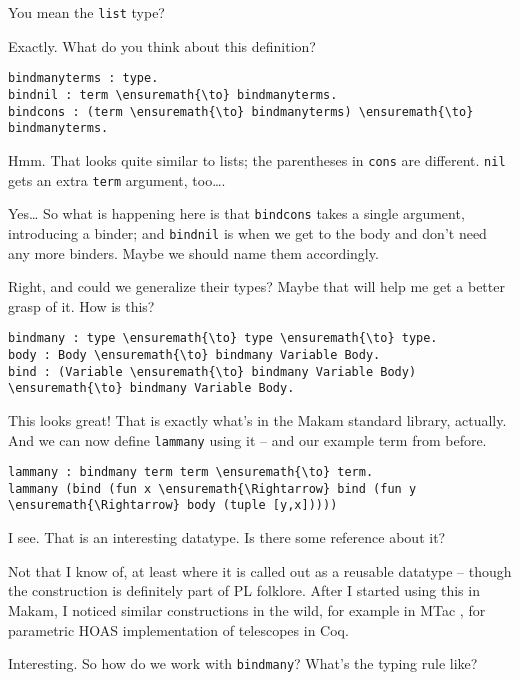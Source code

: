 \heroSTUDENT{} You mean the \texttt{list} type?

\heroADVISOR{} Exactly. What do you think about this definition?

\begin{verbatim}
bindmanyterms : type.
bindnil : term \ensuremath{\to} bindmanyterms.
bindcons : (term \ensuremath{\to} bindmanyterms) \ensuremath{\to} bindmanyterms.
\end{verbatim}

\heroSTUDENT{} Hmm. That looks quite similar to lists; the parentheses in
\texttt{cons} are different. \texttt{nil} gets an extra \texttt{term}
argument, too\ldots{}.

\heroADVISOR{} Yes\ldots{} So what is happening here is that \texttt{bindcons}
takes a single argument, introducing a binder; and \texttt{bindnil} is
when we get to the body and don't need any more binders. Maybe we should
name them accordingly.

\heroSTUDENT{} Right, and could we generalize their types? Maybe that will
help me get a better grasp of it. How is this?

\begin{verbatim}
bindmany : type \ensuremath{\to} type \ensuremath{\to} type.
body : Body \ensuremath{\to} bindmany Variable Body.
bind : (Variable \ensuremath{\to} bindmany Variable Body) \ensuremath{\to} bindmany Variable Body.
\end{verbatim}

\heroADVISOR{} This looks great! That is exactly what's in the Makam standard
library, actually. And we can now define \texttt{lammany} using it --
and our example term from before.

\begin{verbatim}
lammany : bindmany term term \ensuremath{\to} term.
lammany (bind (fun x \ensuremath{\Rightarrow} bind (fun y \ensuremath{\Rightarrow} body (tuple [y,x]))))
\end{verbatim}

\heroSTUDENT{} I see. That is an interesting datatype. Is there some reference
about it?

\heroADVISOR{} Not that I know of, at least where it is called out as a
reusable datatype -- though the construction is definitely part of PL
folklore. After I started using this in Makam, I noticed similar
constructions in the wild, for example in MTac \citep{ziliani2013mtac},
for parametric HOAS implementation of telescopes in Coq.

\heroSTUDENT{} Interesting. So how do we work with \texttt{bindmany}? What's
the typing rule like?

